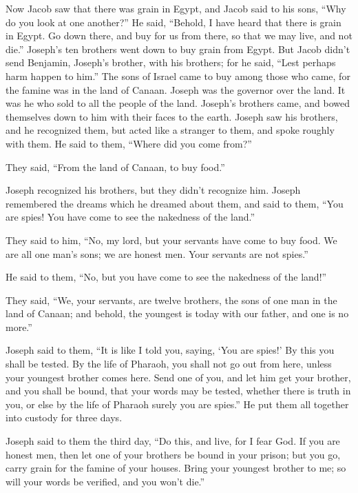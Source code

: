 \mychapter{}
\myverse*{}Now Jacob saw that there was grain in Egypt, and Jacob said to his sons, “Why do you look at one another?” \myverse{}He said, “Behold, I have heard that there is grain in Egypt. Go down there, and buy for us from there, so that we may live, and not die.”  \myverse{}Joseph’s ten brothers went down to buy grain from Egypt.  \myverse{}But Jacob didn’t send Benjamin, Joseph’s brother, with his brothers; for he said, “Lest perhaps harm happen to him.”  \myverse{}The sons of Israel came to buy among those who came, for the famine was in the land of Canaan.  \myverse{}Joseph was the governor over the land. It was he who sold to all the people of the land. Joseph’s brothers came, and bowed themselves down to him with their faces to the earth.  \myverse{}Joseph saw his brothers, and he recognized them, but acted like a stranger to them, and spoke roughly with them. He said to them, “Where did you come from?”

They said, “From the land of Canaan, to buy food.”

\myverse{}Joseph recognized his brothers, but they didn’t recognize him.  \myverse{}Joseph remembered the dreams which he dreamed about them, and said to them, “You are spies! You have come to see the nakedness of the land.”

\myverse{}They said to him, “No, my lord, but your servants have come to buy food.  \myverse{}We are all one man’s sons; we are honest men. Your servants are not spies.”

\myverse{}He said to them, “No, but you have come to see the nakedness of the land!”

\myverse{}They said, “We, your servants, are twelve brothers, the sons of one man in the land of Canaan; and behold, the youngest is today with our father, and one is no more.”

\myverse{}Joseph said to them, “It is like I told you, saying, ‘You are spies!’  \myverse{}By this you shall be tested. By the life of Pharaoh, you shall not go out from here, unless your youngest brother comes here.  \myverse{}Send one of you, and let him get your brother, and you shall be bound, that your words may be tested, whether there is truth in you, or else by the life of Pharaoh surely you are spies.”  \myverse{}He put them all together into custody for three days.

\myverse{}Joseph said to them the third day, “Do this, and live, for I fear God.  \myverse{}If you are honest men, then let one of your brothers be bound in your prison; but you go, carry grain for the famine of your houses.  \myverse{}Bring your youngest brother to me; so will your words be verified, and you won’t die.”

